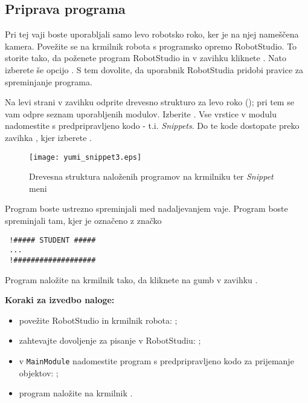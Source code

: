 \subsection{Priprava programa}

Pri tej vaji boste uporabljali samo levo robotsko roko, ker je na njej nameščena kamera. Povežite se na krmilnik robota s programsko opremo RobotStudio. To storite tako, da poženete program RobotStudio in v zavihku  kliknete . Nato izberete še opcijo . S tem dovolite, da uporabnik RobotStudia pridobi pravice za spreminjanje programa.

Na levi strani v zavihku  odprite drevesno strukturo za levo roko (); pri tem se vam odpre seznam uporabljenih modulov. Izberite . Vse vrstice v modulu nadomestite s predpripravljeno kodo - t.i. \emph{Snippets}. Do te kode dostopate preko zavihka , kjer izberete .

\begin{figure}[!hbt]
\centering
\texttt{[image: yumi\_snippet3.eps]}
\caption{Drevesna struktura naloženih programov na krmilniku ter \emph{Snippet} meni}
\label{fig:yumi_snippet}
\end{figure}

Program boste ustrezno spreminjali med nadaljevanjem vaje. Program boste spreminjali tam, kjer je označeno z značko
\begin{verbatim}
 !##### STUDENT #####
 ...
 !###################
\end{verbatim}

Program naložite na krmilnik tako, da kliknete na gumb  v zavihku .

\vspace{5mm}

\begin{mdframed}[backgroundcolor=yellow!20, shadow=true,roundcorner=8pt]
\textbf{Koraki za izvedbo naloge:}
\begin{itemize}
  \item povežite RobotStudio in krmilnik robota: ;
  \item zahtevajte dovoljenje za pisanje v RobotStudiu: ;
  \item v \verb"MainModule" nadomestite program s predpripravljeno kodo za prijemanje objektov: ;
  \item program naložite na krmilnik .
\end{itemize}
\end{mdframed}

